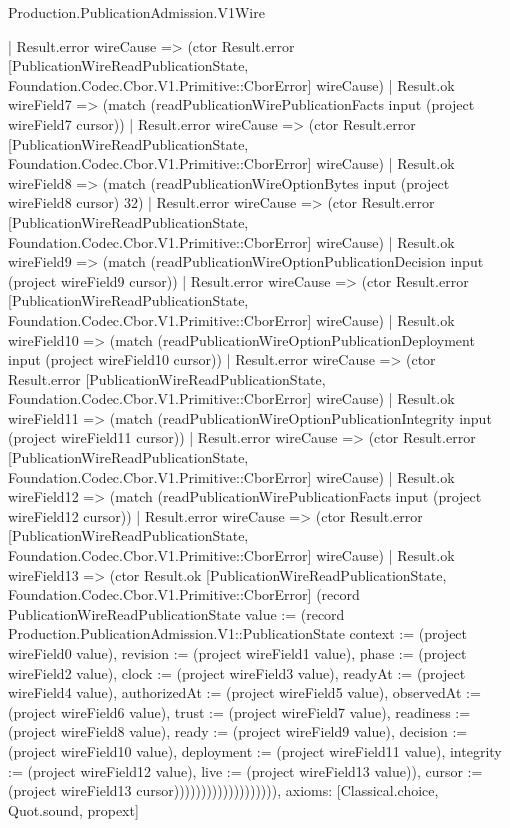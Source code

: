 \begin{lexlean}{Production.PublicationAdmission.V1Wire}
\begin{semanticmodule}
{                      | Result.error wireCause => (ctor Result.error [PublicationWireReadPublicationState, Foundation.Codec.Cbor.V1.Primitive::CborError] wireCause)
                      | Result.ok wireField7 => (match (readPublicationWirePublicationFacts input (project wireField7 cursor))
                        | Result.error wireCause => (ctor Result.error [PublicationWireReadPublicationState, Foundation.Codec.Cbor.V1.Primitive::CborError] wireCause)
                        | Result.ok wireField8 => (match (readPublicationWireOptionBytes input (project wireField8 cursor) 32)
                          | Result.error wireCause => (ctor Result.error [PublicationWireReadPublicationState, Foundation.Codec.Cbor.V1.Primitive::CborError] wireCause)
                          | Result.ok wireField9 => (match (readPublicationWireOptionPublicationDecision input (project wireField9 cursor))
                            | Result.error wireCause => (ctor Result.error [PublicationWireReadPublicationState, Foundation.Codec.Cbor.V1.Primitive::CborError] wireCause)
                            | Result.ok wireField10 => (match (readPublicationWireOptionPublicationDeployment input (project wireField10 cursor))
                              | Result.error wireCause => (ctor Result.error [PublicationWireReadPublicationState, Foundation.Codec.Cbor.V1.Primitive::CborError] wireCause)
                              | Result.ok wireField11 => (match (readPublicationWireOptionPublicationIntegrity input (project wireField11 cursor))
                                | Result.error wireCause => (ctor Result.error [PublicationWireReadPublicationState, Foundation.Codec.Cbor.V1.Primitive::CborError] wireCause)
                                | Result.ok wireField12 => (match (readPublicationWirePublicationFacts input (project wireField12 cursor))
                                  | Result.error wireCause => (ctor Result.error [PublicationWireReadPublicationState, Foundation.Codec.Cbor.V1.Primitive::CborError] wireCause)
                                  | Result.ok wireField13 => (ctor Result.ok [PublicationWireReadPublicationState, Foundation.Codec.Cbor.V1.Primitive::CborError] (record PublicationWireReadPublicationState {value := (record Production.PublicationAdmission.V1::PublicationState {context := (project wireField0 value), revision := (project wireField1 value), phase := (project wireField2 value), clock := (project wireField3 value), readyAt := (project wireField4 value), authorizedAt := (project wireField5 value), observedAt := (project wireField6 value), trust := (project wireField7 value), readiness := (project wireField8 value), ready := (project wireField9 value), decision := (project wireField10 value), deployment := (project wireField11 value), integrity := (project wireField12 value), live := (project wireField13 value)}), cursor := (project wireField13 cursor)})))))))))))))))))),
  axioms: [Classical.choice, Quot.sound, propext]
}


\end{semanticmodule}
\end{lexlean}
